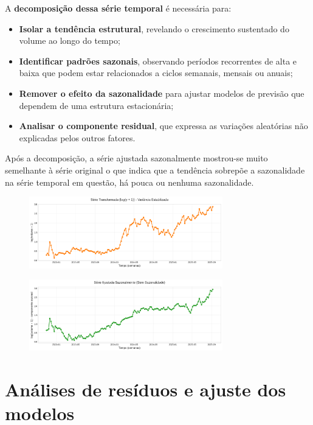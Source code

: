 \documentclass{article}
\begin{document}
A \textbf{decomposição dessa série temporal} é necessária para:

\begin{itemize}
    \item \textbf{Isolar a tendência estrutural}, revelando o crescimento sustentado do volume ao longo do tempo;
    \item \textbf{Identificar padrões sazonais}, observando períodos recorrentes de alta e baixa que podem estar relacionados a ciclos semanais, mensais ou anuais;
    \item \textbf{Remover o efeito da sazonalidade} para ajustar modelos de previsão que dependem de uma estrutura estacionária;
    \item \textbf{Analisar o componente residual}, que expressa as variações aleatórias não explicadas pelos outros fatores.
\end{itemize}

Após a decomposição, a série ajustada sazonalmente mostrou-se muito semelhante à série original o que indica que a tendência sobrepõe a sazonalidade na série temporal em questão, há pouca ou nenhuma sazonalidade.

\begin{figure}[h!]
    \centering
    \includegraphics[width=0.75\textwidth]{images/serie_transformada.png}
    \label{fig:serie-transformada}

    \centering
    \includegraphics[width=0.75\textwidth]{images/serie_ajustada_sazonalmente.png}
    \label{fig:serie-ajustada-sazonalmente}
\end{figure}

\vspace{1em}

\section*{Análises de resíduos e ajuste dos modelos}
\end{document}
